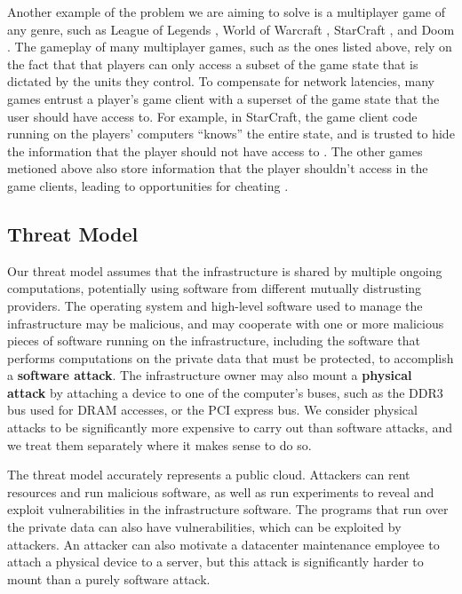 Another example of the problem we are aiming to solve is a multiplayer game of
any genre, such as League of Legends \cite{riot2009lol},
World of Warcraft \cite{blizzard2004wow}, StarCraft \cite{blizzard2010sc2}, and
Doom \cite{id2004doom}. The gameplay of many multiplayer games, such as the
ones listed above, rely on the fact that that players can only access a subset
of the game state that is dictated by the units they control. To compensate for
network latencies, many games entrust a player's game client with a superset
of the game state that the user should have access to. For example, in
StarCraft, the game client code running on the players' computers ``knows'' the
entire state, and is trusted to hide the information that the player should not
have access to \cite{hardy2009cheating}. The other games metioned above also
store information that the player shouldn't access in the game clients, leading
to opportunities for cheating \cite{youtube2013lolcheating}
\cite{youtube2008quake3cheating}.


\subsection{Threat Model}
\label{sec:threat}

Our threat model assumes that the infrastructure is shared by multiple ongoing
computations, potentially using software from different mutually distrusting
providers. The operating system and high-level software used to manage the
infrastructure may be malicious, and may cooperate with one or more malicious
pieces of software running on the infrastructure, including the software that
performs computations on the private data that must be protected, to accomplish
a \textbf{software attack}. The infrastructure owner may also mount a
\textbf{physical attack} by attaching a device to one of the computer's buses,
such as the DDR3 bus used for DRAM accesses, or the PCI express bus. We
consider physical attacks to be significantly more expensive to carry out than
software attacks, and we treat them separately where it makes sense to do so.

The threat model accurately represents a public cloud. Attackers can rent
resources and run malicious software, as well as run experiments to reveal and
exploit vulnerabilities in the infrastructure software. The programs that run
over the private data can also have vulnerabilities, which can be exploited by
attackers. An attacker can also motivate a datacenter maintenance employee to
attach a physical device to a server, but this attack is significantly harder
to mount than a purely software attack.

